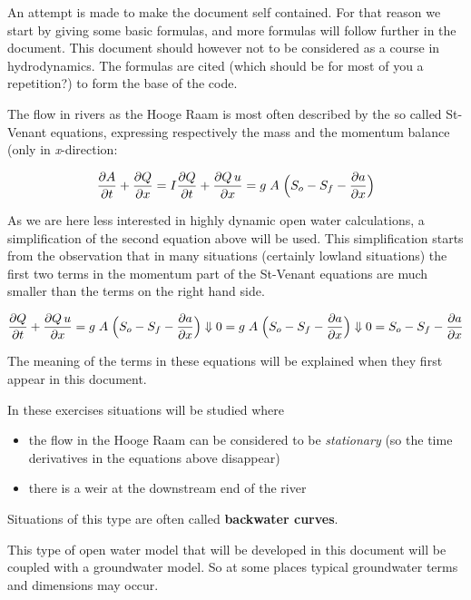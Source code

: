 \documentclass[
]{article}
\providecommand{\tightlist}{%
  \setlength{\itemsep}{0pt}\setlength{\parskip}{0pt}}
\begin{document}
An attempt is made to make the document self contained. For that reason
we start by giving some basic formulas, and more formulas will follow
further in the document. This document should however not to be
considered as a course in hydrodynamics. The formulas are cited (which
should be for most of you a repetition?) to form the base of the code.

The flow in rivers as the Hooge Raam is most often described by the so
called St-Venant equations, expressing respectively the mass and the
momentum balance (only in \emph{x}-direction:

\[
\frac{\partial A}{\partial t} + \frac{\partial Q}{\partial x} = I\\
\frac{\partial Q}{\partial t} + \frac{\partial Q\,u}{\partial x} 
            = g\;A\;\Big( S_o - S_f - \frac{\partial a}{\partial x}\Big)
\]

As we are here less interested in highly dynamic open water
calculations, a simplification of the second equation above will be
used. This simplification starts from the observation that in many
situations (certainly lowland situations) the first two terms in the
momentum part of the St-Venant equations are much smaller than the terms
on the right hand side.

\[
\frac{\partial Q}{\partial t} + \frac{\partial Q\,u}{\partial x} = 
        g\;A\;\Big( S_o - S_f - \frac{\partial a}{\partial x}\Big)\\
\Downarrow \\
0 = g\;A\;\Big( S_o - S_f - \frac{\partial a}{\partial x}\Big)\\
\Downarrow \\
0 =  S_o - S_f - \frac{\partial a}{\partial x}
\]

The meaning of the terms in these equations will be explained when they
first appear in this document.

In these exercises situations will be studied where

\begin{itemize}
\tightlist
\item
  the flow in the Hooge Raam can be considered to be \emph{stationary}
  (so the time derivatives in the equations above disappear)
\item
  there is a weir at the downstream end of the river
\end{itemize}

Situations of this type are often called \textbf{backwater curves}.

This type of open water model that will be developed in this document
will be coupled with a groundwater model. So at some places typical
groundwater terms and dimensions may occur.
\end{document}
